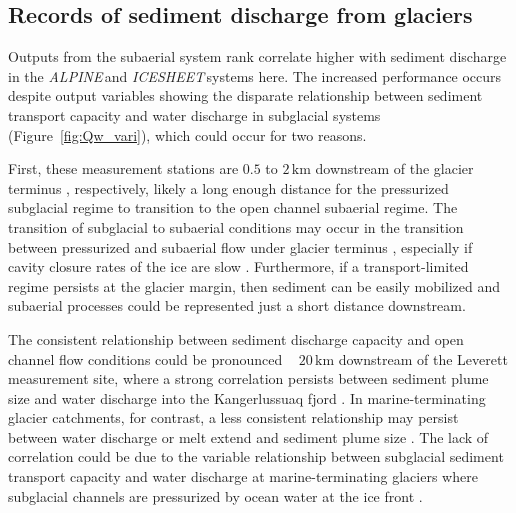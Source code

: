 \documentclass[11pt]{article}
\newcommand{\alpine}{\textit{ALPINE}\,}
\newcommand{\icesheet}{\textit{ICESHEET}\,}
\newcommand{\unit}[1]{$\mathrm{#1}$}
\begin{document}


\subsection{Records of sediment discharge  from glaciers}

Outputs from the subaerial system rank correlate higher with sediment discharge in the \alpine and \icesheet systems here.
The increased performance occurs despite  output variables showing the disparate relationship between sediment transport capacity and water discharge in subglacial systems (Figure~\ref{fig:Qw_vari}), which could occur for two reasons.

First, these measurement stations are $0.5$ to $2$\,\unit{km} downstream of the glacier terminus \citep{cowton2012,felix2022}, respectively, likely a long enough distance for the pressurized subglacial regime to transition to the open channel subaerial regime.
The transition of subglacial to subaerial conditions may occur in the transition between pressurized and subaerial flow under glacier terminus \citep{perolo2018}, especially if cavity closure rates of the ice are slow  \citep{egli2021b}.
Furthermore,  if a transport-limited regime persists at the glacier margin, then sediment can be easily mobilized and subaerial processes could be represented just a short distance downstream.

The consistent relationship between sediment discharge capacity and open channel flow conditions could be pronounced ~ $20$\,\unit{km} downstream of the Leverett measurement site, where a strong correlation persists between sediment plume size and water discharge into the Kangerlussuaq fjord \citep{mcgrath2010}.
In marine-terminating glacier catchments, for contrast, a less consistent relationship may persist between water discharge or melt extend and sediment plume size \citep{tedstone2012}.
The lack of correlation could be due to the variable relationship between subglacial sediment transport capacity and water discharge at marine-terminating glaciers where subglacial channels are pressurized by ocean water at the ice front \citep[e.g.][]{how2017}. 
\end{document}
